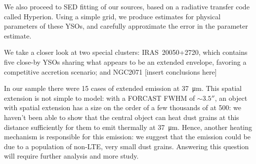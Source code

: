 We also proceed to SED fitting of our sources, based on a radiative transfer code called Hyperion. Using a simple grid, we produce estimates for physical parameters of these YSOs, and carefully approximate the error in the parameter estimate.

We take a closer look at two special clusters: IRAS~20050+2720, which contains five close-by YSOs sharing what appears to be an extended envelope, favoring a competitive accretion scenario; and NGC2071 [insert conclusions here]

In our sample there were 15 cases of extended emission at \SI{37}{\um}. This spatial extension is not simple to model: with a FORCAST FWHM of $\sim\ang{;;3.5}$, an object with spatial extension has a size on the order of a few thousands of \si{\au} at \SI{500}{\pc}: we haven't been able to show that the central object can heat dust grains at this distance sufficiently for them to emit thermally at \SI{37}{\um}. Hence, another heating mechanism is responsible for this emission: we suggest that the emission could be due to a population of non-LTE, very small dust grains. Answering this question will require further analysis and more study.
%
